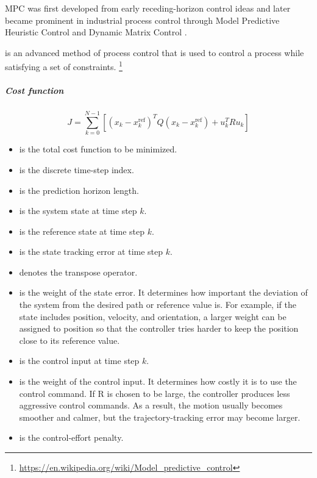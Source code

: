 \documentclass{book}
\providecommand{\seeherefooter}[1]{\footnote{\url{#1}}}
\begin{document}

MPC was first developed from early receding-horizon control ideas
    \citep{propoi-1963-use-of-linear-programming-methods-for-synthesizing-sampled-data-automatic-systems} and later became prominent in industrial process control through Model Predictive
    Heuristic Control and Dynamic Matrix Control
    \citep{richalet-1978-model-predictive-heuristic-control-applications-to-industrial-processes,
        cutler-1980-dynamic-matrix-control-a-computer-control-algorithm}.
    
    is an advanced method of process control that is used to control a process while satisfying a set of constraints. \seeherefooter{https://en.wikipedia.org/wiki/Model\_predictive\_control}
    
    
    \subparagraph{Cost function}
        
        \[
            J =
            \sum_{k=0}^{N-1}
            \left[
                \left( x_k - x_k^{\mathrm{ref}} \right)^{T}
                Q
                \left( x_k - x_k^{\mathrm{ref}} \right)
                +
                u_k^{T} R u_k
            \right]
        \]
        
        \begin{itemize}
            \item[$J$] is the total cost function to be minimized.
            \item[$k$] is the discrete time-step index.
            \item[$N$] is the prediction horizon length.
            \item[$x_k$] is the system state at time step $k$.
            \item[$x_k^{\mathrm{ref}}$] is the reference state at time step $k$.
            \item[$x_k - x_k^{\mathrm{ref}}$] is the state tracking error at time step $k$.
            \item[$(\cdot)^T$] denotes the transpose operator.
            \item[$Q$] is the weight of the state error. It determines how important the deviation of the system from the desired path or reference value is. For example, if the state includes position, velocity, and orientation, a larger weight can be assigned to position so that the controller tries harder to keep the position close to its reference value.
            \item[$u_k$] is the control input at time step $k$.
            \item[$R$] is the weight of the control input. It determines how costly it is to use the control command. If R is chosen to be large, the controller produces less aggressive control commands. As a result, the motion usually becomes smoother and calmer, but the trajectory-tracking error may become larger.
            \item[$u_k^T R u_k$] is the control-effort penalty.
        \end{itemize}
\end{document}
